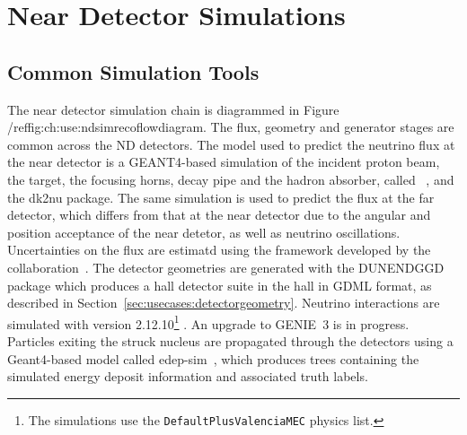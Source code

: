 \documentclass[../main-v1.tex]{subfiles}
\begin{document}
\section{Near Detector Simulations}\label{ch:use:nd}


\subsection{Common Simulation Tools}

The near detector simulation chain is diagrammed in Figure /ref{fig:ch:use:ndsimrecoflowdiagram}. The flux, geometry and generator stages are common across the ND detectors. 
The model used to predict the neutrino flux at the near detector is a GEANT4-based simulation of the incident proton beam, the target, the focusing horns, decay pipe and the hadron absorber, called ~\cite{DUNE:2020ypp}, and the dk2nu package.  The same simulation is used to predict the flux at the far detector, which differs from that at the near detector due to the angular and position acceptance of the near detetor, as well as neutrino oscillations.  Uncertainties on the flux are estimatd using the  framework developed by the  collaboration~\cite{Aliaga:2016oaz,AliagaSoplin:2016shs}.
The detector geometries are generated with the DUNENDGGD package which produces a hall detector suite in the hall in GDML format, as described in Section~\ref{sec:usecases:detectorgeometry}. Neutrino interactions are simulated with  version 2.12.10\footnote{The simulations use the \texttt{DefaultPlusValenciaMEC} physics list.} \cite{Andreopoulos:2009rq}. An upgrade to GENIE~3 is in progress. Particles exiting the struck nucleus are propagated through the detectors using a Geant4-based model called edep-sim~\cite{ref:edep-sim}, which produces  trees containing the simulated energy deposit information and associated truth labels.
\end{document}
